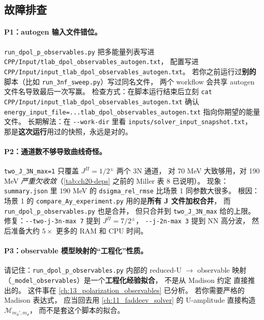 \subsection{故障排查}
\label{sec:ch20-s2-pitfalls}

\paragraph{P1：autogen 输入文件错位。}
\texttt{run\_dpol\_p\_observables.py} 把多能量列表写进
\texttt{CPP/Input/tlab\_dpol\_observables\_autogen.txt}，
配置写进
\texttt{CPP/Input/input\_tlab\_dpol\_observables\_autogen.txt}。
若你之前运行过\textbf{别的}脚本（比如 \texttt{run\_3nf\_sweep.py}）写过同名文件，
两个 workflow 会共享 autogen 文件名导致最后一次写赢。
检查方式：在脚本运行结束后立刻 \texttt{cat CPP/Input/input\_tlab\_dpol\_observables\_autogen.txt}
确认 \texttt{energy\_input\_file=...tlab\_dpol\_observables\_autogen.txt} 指向你期望的能量文件。
长期解法：在 \texttt{-{}-work-dir} 里看 \texttt{inputs/solver\_input\_snapshot.txt}，
那是\textbf{这次运行}用过的快照，永远是对的。

\paragraph{P2：通道数不够导致曲线奇怪。}
\texttt{two\_J\_3N\_max=1} 只覆盖 $J^\Pi = 1/2^\pm$ 两个 3N 通道，
对 70 MeV 大致够用，对 190 MeV \emph{严重欠收敛}（\cref{tab:ch20-deps} 之前的 Miller 表 8 已说明）。
现象：\texttt{summary.json} 里 190 MeV 的 \texttt{dsigma\_rel\_rmse} 比场景 1 同参数大很多。
根因：场景 1 的 \texttt{compare\_Ay\_experiment.py} 用的是\textbf{所有 J 文件加权合并}，
而 \texttt{run\_dpol\_p\_observables.py} 也是合并，
但只合并到 \texttt{two\_J\_3N\_max} 给的上限。
修复：\texttt{-{}-two-j-3n-max 7} 提到 $J^\Pi = 7/2^\pm$，
\texttt{-{}-j-2n-max 3} 提到 NN 高分波，
然后准备大约 $5\times$ 更多的 RAM 和 CPU 时间。

\paragraph{P3：observable 模型映射的“工程化”性质。}
请记住：\texttt{run\_dpol\_p\_observables.py} 内部的 reduced-U $\to$ observable 映射
（\texttt{\_model\_observables}）是一个\textbf{工程化经验拟合}，
不是从 Madison 约定 \cite{Madison1971} 直接推出的。
这件事在 \cref{ch:13_polarization_observables} 已分析。
若你需要严格的 Madison 表达式，
应当回去用 \cref{ch:11_faddeev_solver} 的 U-amplitude 直接构造 $\mathcal{M}_{m_d',m_d}$，
而不是套这个脚本的拟合。

